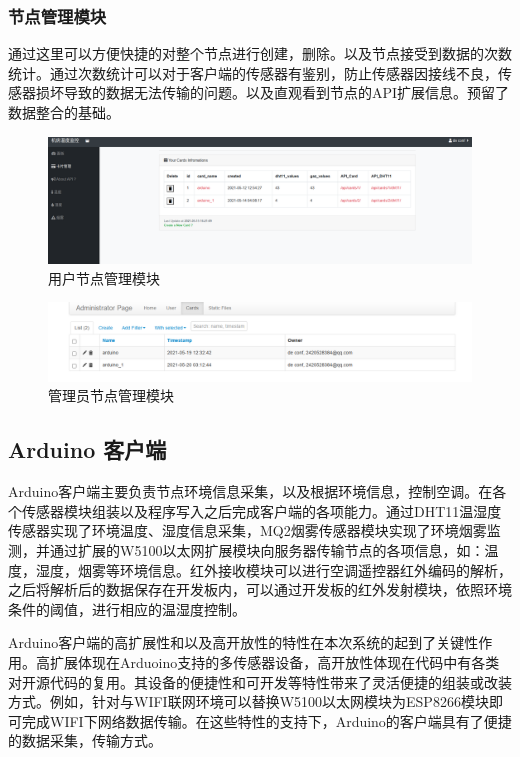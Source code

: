 \subsubsection{节点管理模块}
通过这里可以方便快捷的对整个节点进行创建，删除。以及节点接受到数据的次数统计。通过次数统计可以对于客户端的传感器有鉴别，防止传感器因接线不良，传感器损坏导致的数据无法传输的问题。以及直观看到节点的API扩展信息。预留了数据整合的基础。
\begin{figure}[H]
	\centering
	\includegraphics[width=0.85\linewidth]{figure/cards_edit}
	\caption{用户节点管理模块}
\end{figure}
\begin{figure}[H]
	\centering
	\includegraphics[width=0.85\linewidth]{figure/card_manage}
	\caption{管理员节点管理模块}
\end{figure}

\subsection{Arduino 客户端}

Arduino客户端主要负责节点环境信息采集，以及根据环境信息，控制空调。在各个传感器模块组装以及程序写入之后完成客户端的各项能力。通过DHT11温湿度传感器实现了环境温度、湿度信息采集，MQ2烟雾传感器模块实现了环境烟雾监测，并通过扩展的W5100以太网扩展模块向服务器传输节点的各项信息，如：温度，湿度，烟雾等环境信息。红外接收模块可以进行空调遥控器红外编码的解析，之后将解析后的数据保存在开发板内，可以通过开发板的红外发射模块，依照环境条件的阈值，进行相应的温湿度控制。

Arduino客户端的高扩展性和以及高开放性的特性在本次系统的起到了关键性作用。高扩展体现在Arduoino支持的多传感器设备，高开放性体现在代码中有各类对开源代码的复用。其设备的便捷性和可开发等特性带来了灵活便捷的组装或改装方式。例如，针对与WIFI联网环境可以替换W5100以太网模块为ESP8266模块即可完成WIFI下网络数据传输。在这些特性的支持下，Arduino的客户端具有了便捷的数据采集，传输方式。 

